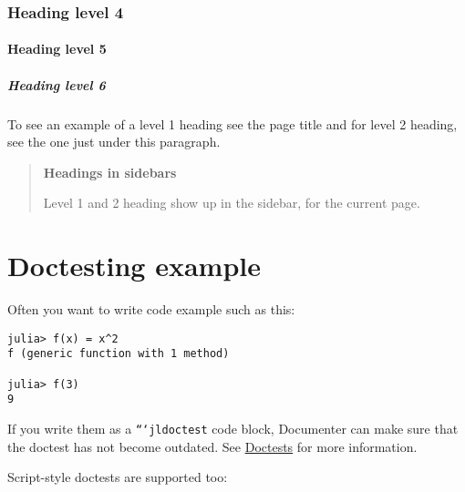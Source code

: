\label{13085847155693612023}{}


\subsubsection{Heading level 4}



\label{12782044777122551513}{}


\paragraph{Heading level 5}



\label{9543099701887315540}{}


\subparagraph{Heading level 6}



\label{10897944457118690625}{}


To see an example of a level 1 heading see the page title and for level 2 heading, see the one just under this paragraph.



\begin{quote}
\textbf{Headings in sidebars}

Level 1 and 2 heading show up in the sidebar, for the current page.

\end{quote}


\section{Doctesting example}



\label{10597583416623881668}{}


Often you want to write code example such as this:




\begin{verbatim}
julia> f(x) = x^2
f (generic function with 1 method)

julia> f(3)
9
\end{verbatim}



If you write them as a \texttt{```jldoctest} code block, Documenter can make sure that the doctest has not become outdated. See \href{@ref}{Doctests} for more information.



Script-style doctests are supported too:




